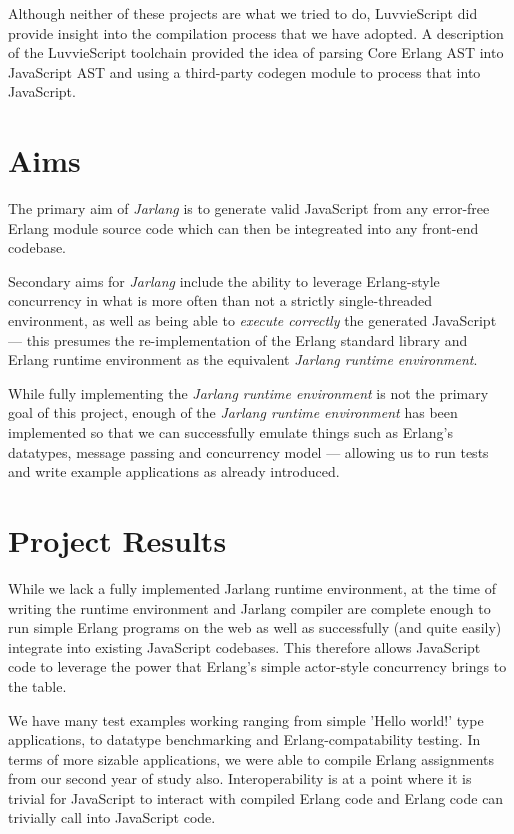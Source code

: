 \documentclass[twoside,12pt,titlepage,a4paper]{article}
\newcommand\blankpage{%
    \null
    \thispagestyle{empty}%
    \addtocounter{page}{-1}%
    \newpage}
\begin{document}
Although neither of these projects are what we tried to do, LuvvieScript did provide insight into the compilation process that we have adopted. A description of the LuvvieScript toolchain \citep{luvvieWebWayBack} provided the idea of parsing Core Erlang AST into JavaScript AST and using a third-party codegen module to process that into JavaScript.

\section{Aims}
\label{Aims}
The primary aim of \textit{Jarlang} is to generate valid JavaScript from any error-free Erlang module source code which can then be integreated into any front-end codebase.

Secondary aims for \textit{Jarlang} include the ability to leverage Erlang-style concurrency in what is more often than not a strictly single-threaded environment, as well as being able to \textit{execute correctly} the generated JavaScript --- this presumes the re-implementation of the Erlang standard library and Erlang runtime environment as the equivalent \textit{Jarlang runtime environment}.

While fully implementing the \textit{Jarlang runtime environment} is not the primary goal of this project, enough of the \textit{Jarlang runtime environment} has been implemented so that we can successfully emulate things such as Erlang's datatypes, message passing and concurrency model --- allowing us to run tests and write example applications as already introduced.


\blankpage
\section{Project Results}
\label{Results}
While we lack a fully implemented Jarlang runtime environment, at the time of writing the runtime environment and Jarlang compiler are complete enough to run simple Erlang programs on the web as well as successfully (and quite easily) integrate into existing JavaScript codebases. This therefore allows JavaScript code to leverage the power that Erlang's simple actor-style concurrency brings to the table.

We have many test examples working ranging from simple 'Hello world!' type applications, to datatype benchmarking and Erlang-compatability testing. In terms of more sizable applications, we were able to compile Erlang assignments from our second year of study also. Interoperability is at a point where it is trivial for JavaScript to interact with compiled Erlang code and Erlang code can trivially call into JavaScript code.
\end{document}
